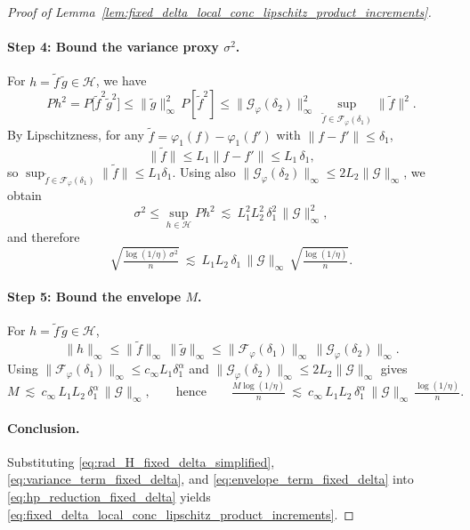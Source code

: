 \documentclass[11pt]{article}
\theoremstyle{plain}
\theoremstyle{definition} %
\begin{document}
\begin{proof}[Proof of Lemma~\ref{lem:fixed_delta_local_conc_lipschitz_product_increments}]
\paragraph{Step 4: Bound the variance proxy $\sigma^2$.}
For $h=\tilde f\,\tilde g\in\mathcal H$, we have
\[
P h^2
=
P\bigl[\tilde f^2\tilde g^2\bigr]
\le
\|\tilde g\|_\infty^2\,P[\tilde f^2]
\le
\|\mathcal G_{\varphi}(\delta_2)\|_\infty^2\,
\sup_{\tilde f\in\mathcal F_{\varphi}(\delta_1)} \|\tilde f\|^2.
\]
By Lipschitzness, for any $\tilde f=\varphi_1(f)-\varphi_1(f')$ with $\|f-f'\|\le \delta_1$,
\[
\|\tilde f\|
\le
L_1\|f-f'\|
\le
L_1\,\delta_1,
\]
so $\sup_{\tilde f\in\mathcal F_{\varphi}(\delta_1)}\|\tilde f\|\le L_1\delta_1$. Using also
$\|\mathcal G_{\varphi}(\delta_2)\|_\infty\le 2L_2\|\mathcal G\|_\infty$, we obtain
\[
\sigma^2
\le
\sup_{h\in\mathcal H}Ph^2
\ \lesssim\
L_1^2L_2^2\,\delta_1^2\,\|\mathcal G\|_\infty^2,
\]
and therefore
\begin{equation}
\label{eq:variance_term_fixed_delta}
\sqrt{\tfrac{\log(1/\eta)\,\sigma^2}{n}}
\ \lesssim\
L_1L_2\,\delta_1\,\|\mathcal G\|_\infty\,\sqrt{\tfrac{\log(1/\eta)}{n}}.
\end{equation}

\paragraph{Step 5: Bound the envelope $M$.}
For $h=\tilde f\,\tilde g\in\mathcal H$,
\[
\|h\|_\infty\le \|\tilde f\|_\infty\,\|\tilde g\|_\infty
\le
\|\mathcal F_{\varphi}(\delta_1)\|_\infty\,\|\mathcal G_{\varphi}(\delta_2)\|_\infty.
\]
Using $\|\mathcal F_{\varphi}(\delta_1)\|_\infty\le c_\infty L_1\delta_1^\alpha$ and
$\|\mathcal G_{\varphi}(\delta_2)\|_\infty\le 2L_2\|\mathcal G\|_\infty$ gives
\begin{equation}
\label{eq:envelope_term_fixed_delta}
M
\ \lesssim\
c_\infty\,L_1L_2\,\delta_1^\alpha\,\|\mathcal G\|_\infty,
\qquad\text{hence}\qquad
\tfrac{M\log(1/\eta)}{n}
\ \lesssim\
c_\infty\,L_1L_2\,\delta_1^\alpha\,\|\mathcal G\|_\infty\,\tfrac{\log(1/\eta)}{n}.
\end{equation}

\paragraph{Conclusion.}
Substituting \eqref{eq:rad_H_fixed_delta_simplified}, \eqref{eq:variance_term_fixed_delta}, and \eqref{eq:envelope_term_fixed_delta}
into \eqref{eq:hp_reduction_fixed_delta} yields \eqref{eq:fixed_delta_local_conc_lipschitz_product_increments}.
\end{proof}
\end{document}
